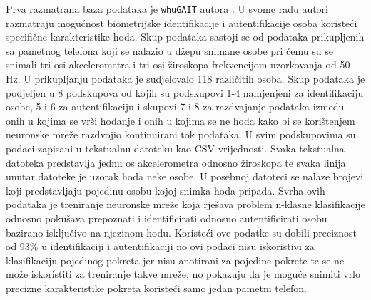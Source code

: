 \documentclass[times, utf8, diplomski]{fer}
\begin{document}
Prva razmatrana baza podataka je \texttt{whuGAIT} autora \cite{zou2020gait}. U svome radu autori razmatraju mogućnost biometrijske
identifikacije i autentifikacije osoba koristeći specifične karakteristike hoda. Skup podataka sastoji se od podataka prikupljenih
sa pametnog telefona koji se nalazio u džepu snimane osobe pri čemu su se snimali tri osi akcelerometra i tri osi
žiroskopa frekvencijom uzorkovanja od 50 Hz. U prikupljanju podataka je sudjelovalo 118 različitih osoba. Skup podataka je podjeljen
u 8 podskupova od kojih su podskupovi 1-4 namjenjeni za identifikaciju osobe, 5 i 6 za autentifikaciju i skupovi 7 i 8 za
razdvajanje podataka između onih u kojima se vrši hodanje i onih u kojima se ne hoda kako bi se korištenjem neuronske mreže
razdvojio kontinuirani tok podataka. U svim podskupovima su podaci zapisani u tekstualnu datoteku kao CSV vrijednosti. Svaka
tekstualna datoteka predstavlja jednu os akcelerometra odnosno žiroskopa te svaka linija unutar datoteke je uzorak hoda neke osobe.
U posebnoj datoteci se nalaze brojevi koji predstavljaju pojedinu osobu kojoj snimka hoda pripada. Svrha ovih podataka je treniranje
neuronske mreže koja rješava problem n-klasne klasifikacije odnosno pokušava prepoznati i identificirati odnosno autentificirati
osobu bazirano isključivo na njezinom hodu. Koristeći ove podatke \cite{zou2020gait} su dobili preciznost od 93\% u identifikaciji 
i autentifikaciji no ovi podaci nisu iskoristivi za klasifikaciju pojedinog pokreta jer nisu anotirani za pojedine pokrete te se 
ne može iskoristiti za treniranje takve mreže, no pokazuju da je moguće snimiti vrlo precizne karakteristike pokreta koristeći samo 
jedan pametni telefon.
\end{document}
